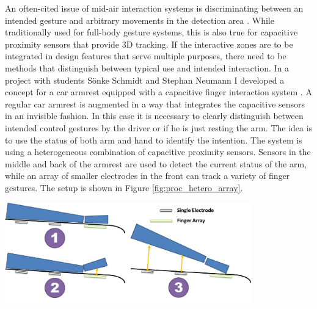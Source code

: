 An often-cited issue of mid-air interaction systems is discriminating between an intended gesture and arbitrary movements in the detection area \cite{hinckley1994survey}. While traditionally used for full-body gesture systems, this is also true for capacitive proximity sensors that provide 3D tracking. If the interactive zones are to be integrated in design features that serve multiple purposes, there need to be methods that distinguish between typical use and intended interaction. In a project with students Sönke Schmidt and Stephan Neumann I developed a concept for a car armrest equipped with a capacitive finger interaction system \cite{braun2013ActiveArmrest}. A regular car armrest is augmented in a way that integrates the capacitive sensors in an invisible fashion. In this case it is necessary to clearly distinguish between intended control gestures by the driver or if he is just resting the arm. The idea is to use the status of both arm and hand to identify the intention. The system is using a heterogeneous combination of capacitive proximity sensors. Sensors in the middle and back of the armrest are used to detect the current status of the arm, while an array of smaller electrodes in the front can track a variety of finger gestures. The setup is shown in Figure \ref{fig:proc_hetero_array}. 

\begin{minipage}{\linewidth}
\centering
\includegraphics[width=0.8\textwidth]{images/proc_hetero_postures}
\label{fig:proc_hetero_postures}
\end{minipage}

